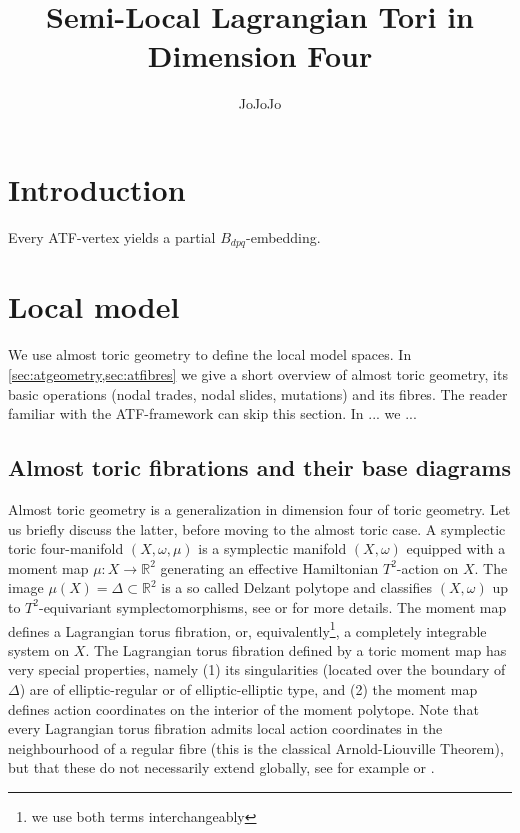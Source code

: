 \documentclass[12pt,a4paper,draft]{scrartcl}
\begin{document}
\title{Semi-Local Lagrangian Tori in Dimension Four}
\author{JoJoJo}

\maketitle

\section{Introduction}

Every ATF-vertex yields a partial $B_{dpq}$-embedding.


\section{Local model}

We use almost toric geometry to define the local model spaces.
In \cref{sec:atgeometry,sec:atfibres} we give a short overview of almost toric geometry, its basic operations (nodal trades, nodal slides, mutations) and its fibres.
The reader familiar with the ATF-framework can skip this section.
In ... we ...


\subsection{Almost toric fibrations and their base diagrams}
\label{sec:atgeometry}

Almost toric geometry is a generalization in dimension four of toric geometry.
Let us briefly discuss the latter, before moving to the almost toric case.
A symplectic toric four-manifold $(X,\omega,\mu)$ is a symplectic manifold $(X,\omega)$ equipped with a moment map $\mu \colon X \rightarrow \mathbb{R}^2$ generating an effective Hamiltonian $T^2$-action on $X$.
The image $\mu(X) = \Delta \subset \mathbb{R}^2$ is a so called Delzant polytope and classifies $(X,\omega)$ up to $T^2$-equivariant symplectomorphisms, see \cite{Del88} or \cite{Can03} for more details.
The moment map defines a Lagrangian torus fibration, or, equivalently\footnote{we use both terms interchangeably}, a completely integrable system on $X$.
The Lagrangian torus fibration defined by a toric moment map has very special properties, namely (1) its singularities (located over the boundary of $\Delta$) are of elliptic-regular or of elliptic-elliptic type, and (2) the moment map defines action coordinates on the interior of the moment polytope.
Note that every Lagrangian torus fibration admits local action coordinates in the neighbourhood of a regular fibre (this is the classical Arnold-Liouville Theorem), but that these do not necessarily extend globally, see for example \cite{Dui80} or \cite{Zun96,Zun03}.
\end{document}
